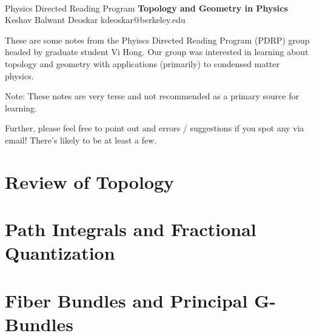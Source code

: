 \documentclass[11pt]{article}
\begin{document}
\thispagestyle{empty}
\bigskip \
\vspace{0.1cm}

\begin{center}
{\fontsize{22}{22} \selectfont Physics Directed Reading Program}
\vskip 16pt
{\fontsize{36}{36} \selectfont \bf \sffamily Topology and Geometry in Physics}
\vskip 24pt
{\fontsize{18}{18} \selectfont \rmfamily Keshav Balwant Deoskar} 
\vskip 6pt
{\fontsize{14}{14} \selectfont \ttfamily kdeoskar@berkeley.edu} 
\vskip 24pt
\end{center}



These are some notes from the Phyiscs Directed Reading Program (PDRP) group headed by graduate student Vi Hong. Our group was interested in learning about topology and geometry with applications (primarily) to condensed matter physics.   


\vskip 0.5cm
\begin{redbox}
    Note: These notes are very terse and not recommended as a primary source for learning. 
    \vskip 0.5cm
    
    Further, please feel free to point out and errors / suggestions if you spot any via email! There's likely to be at least a few. 
\end{redbox}

\tableofcontents 


\newpage
\section{Review of Topology}
\vskip 0.5cm


\newpage
\section{Path Integrals and Fractional Quantization}
\vskip 0.5cm


\newpage
\section{Fiber Bundles and Principal G-Bundles}
\vskip 0.5cm
\end{document}
